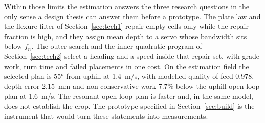 Within those limits the estimation answers the three research questions in the only sense a design thesis can answer them before a prototype. The plate law and the flexure filter of Section~\ref{sec:tech1} repair empty cells only while the repair fraction is high, and they assign mean depth to a servo whose bandwidth sits below \(f_n\). The outer search and the inner quadratic program of Section~\ref{sec:tech2} select a heading and a speed inside that repair set, with grade work, turn time and failed placements in one cost. On the estimation field the selected plan is \ang{55} from uphill at \SI{1.4}{m/s}, with modelled quality of feed \num{0.978}, depth error \SI{2.15}{mm} and non-conservative work \num{7.7}\% below the uphill open-loop plan at \SI{1.6}{m/s}. The resonant open-loop plan is faster and, in the same model, does not establish the crop. The prototype specified in Section~\ref{sec:build} is the instrument that would turn these statements into measurements.
